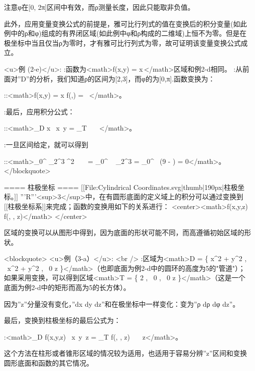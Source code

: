 \documentclass[UTF-8]{ctexart}
\begin{document}
注意φ在[0, 2π]区间中有效，而ρ测量长度，因此只能取非负值。

此外，应用变量变换公式的前提是，雅可比行列式的值在变换后的积分变量(如此例中的ρ和φ)组成的有界闭区域(如此例中φ和ρ构成的二维域)上恒不为零。但是在极坐标中当且仅当ρ为零时，才有雅可比行列式为零，故可证明该变量变换公式成立。



<u>例 (2-e)</u>:
:函数为<math>f(x,y) = x\,\!</math>区域和例2-d相同。
:从前面对''D''的分析，我们知道ρ的区间为[2,3]，而φ的为[0,π].函数变换为：

::<math>f(x,y) = x \longrightarrow f(\rho,\phi) = \rho \ \cos \phi</math>。

:最后，应用积分公式：

::<math>\iint_D x \, x\, y = \iint_T \rho \cos \phi \ \rho \, \rho\, \phi</math>。

:一旦区间给定，就可以得到

::<math>\int_0^{\pi} \int_2^3 \rho^2 \cos \phi \  \rho \  \phi = \int_0^{\pi} \cos \phi \  \phi {}_2^3 = \left[ \sin \phi \right]_0^{\pi} \ \left(9 -  \right) = 0</math>。
</blockquote>

==== 柱极坐标 ====
[[File:Cylindrical Coordinates.svg|thumb|190px|柱极坐标。]]
'''R'''<sup>3</sup>中，在有圆形底面的定义域上的积分可以通过变换到[[柱极坐标系]]来完成；函数的变换用如下的关系进行：
<center><math>f(x,y,z) \rightarrow f(\rho \cos \phi, \rho \sin \phi, z)</math> </center>

区域的变换可以从图形中得到，因为底面的形状可能不同，而高遵循初始区域的形状。

<blockquote>
<u>例（3-a）</u>: <br />
:区域为<math>D = \{ x^2 + y^2 , \ x^2 + y^2 , \ 0 \le z  \}</math>（也即底面为例2-d中的圆环的高度为5的"管道"）；如果采用变换，可以得到区域<math>T = \{ 2 \le \rho {}, \ 0 \le \phi \le \pi, \ 0 \le z  \}</math>（这是一个底面为例2-d中的矩形而高为5的长方体）。

因为''z''分量没有变化，''dx dy dz''和在极坐标中一样变化：变为''ρ dρ dφ dz''。

最后，变换到柱极坐标的最后公式为：

:<math>\iiint_D f(x,y,z) \, x\, y\, z = \iiint_T f(\rho \cos \phi, \rho \sin \phi, z) \rho \, \rho\, \phi\, z</math>。

这个方法在柱形或者锥形区域的情况较为适用，也适用于容易分辨''z''区间和变换圆形底面和函数的其它情况。
\end{document}

